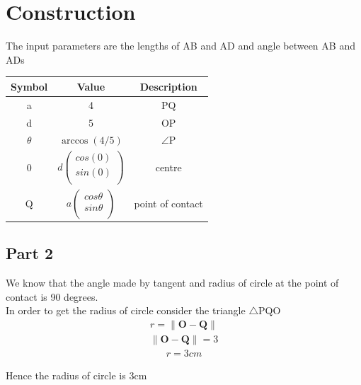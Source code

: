 \documentclass[journal,10pt,twocolumn]{article}
\providecommand{\norm}[1]{\left\lVert#1\right\rVert}
\let\vec\mathbf
\begin{document}
{\section*{Construction}
The input parameters are the lengths of AB and AD and angle between AB and ADs \vspace{2mm}\\
{
\setlength\extrarowheight{2pt}
\begin{tabular}{|c|c|c|}
 \hline
 \textbf{Symbol}&\textbf{Value}&\textbf{Description}\\
 \hline
 a&4&PQ\\
 \hline
 d&5&OP\\
 \hline
	$\theta$&$\arccos(4/5)$&$\angle$P\\
 \hline
 0&$d%
 \begin{pmatrix}
  cos(0)\\
  sin(0)\\
 \end{pmatrix}$%
 &centre\\
 \hline
 Q&$a%
 \begin{pmatrix}
  cos\theta\\
  sin\theta\\
 \end{pmatrix}$%
 &point of contact\\
 \hline
\end{tabular}
}
\subsection*{Part 2}
We know that the angle made by tangent and radius of circle at the point of contact is 90 degrees. \\
In order to get the radius of circle consider the triangle $\triangle$PQO \\
\begin{align}
	r = \norm{\vec{O}-\vec{Q}}
\end{align}
\begin{align}
	\norm{\vec{O} - \vec{Q}}= 3
\end{align}
\begin{align}
  r= 3 cm 
\end{align}


Hence the radius of circle is 3cm

}
\end{document}
